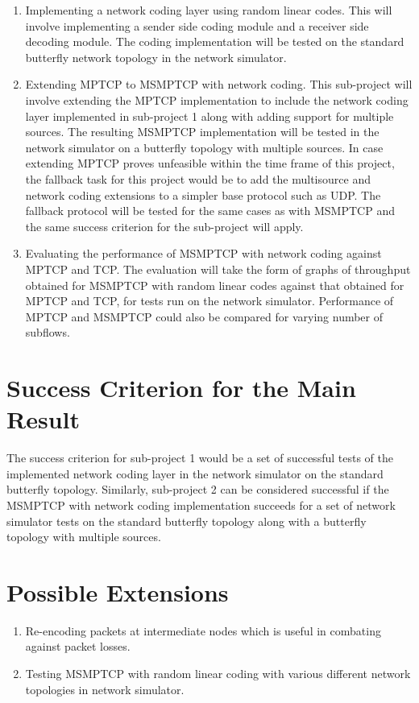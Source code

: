 \documentclass[12pt,a4paper,twoside]{article}
\begin{document}
\begin{enumerate}
  \item Implementing a network coding layer using random linear codes. This will involve implementing a sender side coding module and a receiver side decoding module. The coding implementation will be tested on the standard butterfly network topology in the network simulator. 
  \item Extending MPTCP to MSMPTCP with network coding. This sub-project will involve extending the MPTCP implementation to include the network coding layer implemented in sub-project 1 along with adding support for multiple sources. The resulting MSMPTCP implementation will be tested in the network simulator on a butterfly topology with multiple sources. In case extending MPTCP proves unfeasible within the time frame of this project, the fallback task for this project would be to add the multisource and network coding extensions to a simpler base protocol such as UDP. The fallback protocol will be tested for the same cases as with MSMPTCP and the same success criterion for the sub-project will apply.
  \item Evaluating the performance of MSMPTCP with network coding against MPTCP and TCP. The evaluation will take the form of graphs of throughput obtained for MSMPTCP with random linear codes against that obtained for MPTCP and TCP, for tests run on the network simulator. Performance of MPTCP and MSMPTCP could also be compared for varying number of subflows. 
\end{enumerate}

\section*{Success Criterion for the Main Result}

The success criterion for sub-project 1 would be a set of successful tests of the implemented network coding layer in the network simulator on the standard butterfly topology. Similarly, sub-project 2 can be considered successful if the MSMPTCP with network coding implementation succeeds for a set of network simulator tests on the standard butterfly topology along with a butterfly topology with multiple sources. 

\section*{Possible Extensions}

\begin{enumerate}
  \item Re-encoding packets at intermediate nodes which is useful in combating against packet losses.
  \item Testing MSMPTCP with random linear coding with various different network topologies in network simulator.
\end{enumerate}
\end{document}
